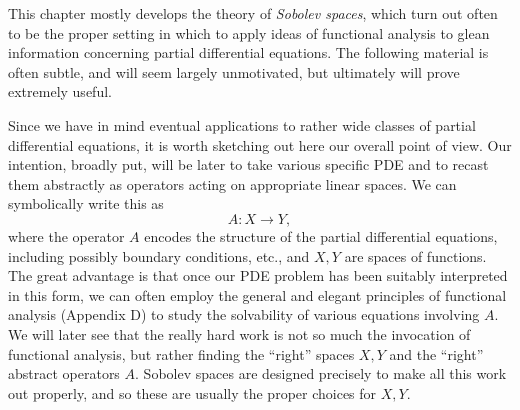 %


This chapter mostly develops the theory of \textit{Sobolev spaces}, which turn out often to be the proper setting in which to apply ideas of functional analysis to glean information concerning partial differential equations. The following material is often subtle, and will seem largely unmotivated, but ultimately will prove extremely useful.

Since we have in mind eventual applications to rather wide classes of partial differential equations, it is worth sketching out here our overall point of view. Our intention, broadly put, will be later to take various specific PDE and to recast them abstractly as operators acting on appropriate linear spaces. We can symbolically write this as
$$A : X \to Y,$$
where the operator $A$ encodes the structure of the partial differential equations, including possibly boundary conditions, etc., and $X, Y$ are spaces of functions. The great advantage is that once our PDE problem has been suitably interpreted in this form, we can often employ the general and elegant principles of functional analysis (Appendix D) to study the solvability of various equations involving $A$. We will later see that the really hard work is not so much the invocation of functional analysis, but rather finding the ``right'' spaces $X, Y$ and the ``right'' abstract operators $A$. Sobolev spaces are designed precisely to make all this work out properly, and so these are usually the proper choices for $X, Y$.

